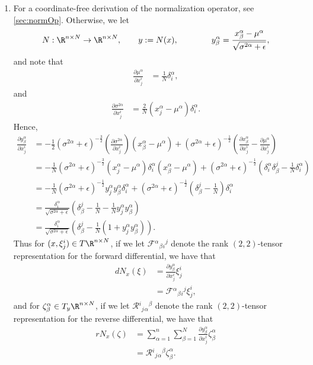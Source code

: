 \begin{enumerate}
	\item For a coordinate-free derivation of the normalization operator, see \cref{sec:normOp}.  Otherwise, we let 
	$$N:\R^{n\times N}\to\R^{n\times N}, \qquad y:=N(x),\qquad\qquad y^\alpha_\beta=\frac{x^\alpha_\beta-\mu^\alpha}{\sqrt{\sigma^{2\alpha}+\epsilon}},$$
	and note that
	\begin{align*}
		\frac{\partial\mu^\alpha}{\partial x^i_j}&=\frac{1}{N}\delta^\alpha_i,
	\end{align*}
	and
	\begin{align*}
		\frac{\partial \sigma^{2\alpha}}{\partial x^i_j}&=\frac{2}{N}(x^\alpha_j-\mu^\alpha)\delta_i^\alpha.
	\end{align*}
	Hence,
	\begin{align*}
		\frac{\partial y^\alpha_\beta}{\partial x^i_j}&=-\frac{1}{2}(\sigma^{2\alpha}+\epsilon)^{-\frac{3}{2}}\left(\frac{\partial \sigma^{2\alpha}}{\partial x^i_j}\right)(x^\alpha_\beta-\mu^\alpha)+(\sigma^{2\alpha}+\epsilon)^{-\frac{1}{2}}\left(\frac{\partial x^\alpha_\beta}{\partial x^i_j}-\frac{\partial\mu^\alpha}{\partial x^i_j}\right)\\
		&=-\frac{1}{N}(\sigma^{2\alpha}+\epsilon)^{-\frac{3}{2}}(x^\alpha_j-\mu^\alpha)\delta^\alpha_i(x^\alpha_\beta-\mu^\alpha)+(\sigma^{2\alpha}+\epsilon)^{-\frac{1}{2}}\left(\delta_i^\alpha\delta_\beta^j-\frac{1}{N}\delta_i^\alpha\right)\\
		&=-\frac{1}{N}(\sigma^{2\alpha}+\epsilon)^{-\frac{1}{2}}y^\alpha_jy^\alpha_\beta\delta_i^\alpha+(\sigma^{2\alpha}+\epsilon)^{-\frac{1}{2}}\left(\delta^j_\beta-\frac{1}{N}\right)\delta_i^\alpha\\
		&=\frac{\delta^\alpha_i}{\sqrt{\sigma^{2\alpha}+\epsilon}}\left(\delta^j_\beta-\frac{1}{N}-\frac{1}{N}y^\alpha_jy^\alpha_\beta\right)\\
		&=\frac{\delta^\alpha_i}{\sqrt{\sigma^{2\alpha}+\epsilon}}\left(\delta^j_\beta-\frac{1}{N}(1+y^\alpha_jy^\alpha_\beta)\right).
	\end{align*}
	Thus for $(x,\xi^i_j)\in T\R^{n\times N}$, if we let $\mathcal{F}{{^\alpha}{_\beta}{_i}{^j}}$ denote the rank $(2,2)$-tensor representation for the forward differential, we have that
	\begin{align*}
		dN_x(\xi)&=\frac{\partial y^\alpha_\beta}{\partial x^i_j}\xi^i_j\\
		&=\mathcal{F}{{^\alpha}{_\beta}{_i}{^j}}\xi^i_j,
	\end{align*}
	and for $\zeta^\alpha_\beta\in T_y\R^{n\times N}$, if we let $\mathcal{R}{{^i}{_j}{_\alpha}{^\beta}}$ denote the rank $(2,2)$-tensor representation for the reverse differential, we have that
	\begin{align*}
		rN_x(\zeta)&=\sum_{\alpha=1}^n\sum_{\beta=1}^N\frac{\partial y^\alpha_\beta}{\partial x^i_j}\zeta^\alpha_\beta\\
		&=\mathcal{R}{{^i}{_j}{_\alpha}{^\beta}}\zeta^\alpha_\beta.
	\end{align*}
	

\end{enumerate}
